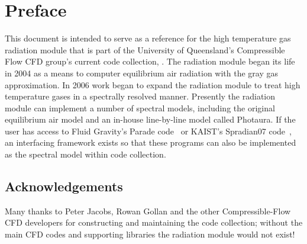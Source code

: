 \chapter*{Preface}

This document is intended to serve as a reference for the high temperature gas radiation module that is part of the University of Queensland's Compressible Flow CFD group's current code collection, \cite{cfcfd3}.
The radiation module began its life in 2004 as a means to computer equilibrium air radiation with the gray gas approximation.
In 2006 work began to expand the radiation module to treat high temperature gases in a spectrally resolved manner.
Presently the radiation module can implement a number of spectral models, including the original equilibrium air model and an in-house line-by-line model called Photaura.
If the user has access to Fluid Gravity's Parade code~\cite{SBF+11} or KAIST's Spradian07 code~\cite{hyun_phd}, an interfacing framework exists so that these programs can also be implemented as the spectral model within code collection.  

\section*{Acknowledgements}

Many thanks to Peter Jacobs, Rowan Gollan and the other Compressible-Flow CFD developers for constructing and maintaining the code collection; without the main CFD codes and supporting libraries the radiation module would not exist!